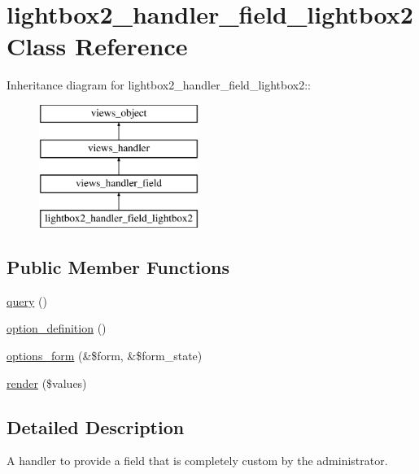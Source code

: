 \hypertarget{classlightbox2__handler__field__lightbox2}{
\section{lightbox2\_\-handler\_\-field\_\-lightbox2 Class Reference}
\label{classlightbox2__handler__field__lightbox2}
}
Inheritance diagram for lightbox2\_\-handler\_\-field\_\-lightbox2::\begin{figure}[H]
\begin{center}
\leavevmode
\includegraphics[height=4cm]{classlightbox2__handler__field__lightbox2}
\end{center}
\end{figure}
\subsection*{Public Member Functions}
\begin{CompactItemize}
\item 
\hyperlink{classlightbox2__handler__field__lightbox2_be83b39eb7bab1582a1038543f59e277}{query} ()
\item 
\hyperlink{classlightbox2__handler__field__lightbox2_641e7b72ac54a1c6baf7fd2bd6424438}{option\_\-definition} ()
\item 
\hyperlink{classlightbox2__handler__field__lightbox2_6e0462dcba8bb237b822be3d844ed24b}{options\_\-form} (\&\$form, \&\$form\_\-state)
\item 
\hyperlink{classlightbox2__handler__field__lightbox2_141baaefa052c49b0084cd88dc3d50ce}{render} (\$values)
\end{CompactItemize}


\subsection{Detailed Description}
A handler to provide a field that is completely custom by the administrator. 

